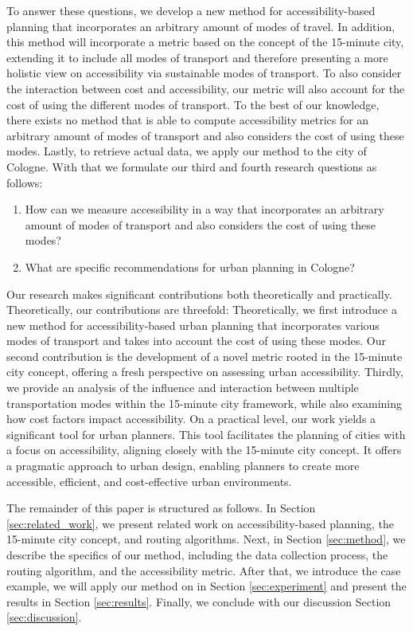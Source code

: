 To answer these questions, we develop a new method for accessibility-based planning that incorporates an arbitrary amount of modes of travel.
In addition, this method will incorporate a metric based on the concept of the 15-minute city, extending it to include all modes of transport and therefore presenting a more holistic view on accessibility via sustainable modes of transport.
To also consider the interaction between cost and accessibility, our metric will also account for the cost of using the different modes of transport.
To the best of our knowledge, there exists no method that is able to compute accessibility metrics for an arbitrary amount of modes of transport and also considers the cost of using these modes.
Lastly, to retrieve actual data, we apply our method to the city of Cologne.
With that we formulate our third and fourth research questions as follows:

\begin{enumerate}
  \renewcommand{\labelenumi}{RQ \theenumi.}
  \setcounter{enumi}{2}
  \item How can we measure accessibility in a way that incorporates an arbitrary amount of modes of transport and also considers the cost of using these modes?
  \label{rq:measure_accessibility}
  \item What are specific recommendations for urban planning in Cologne?
  \label{rq:recommendations}
\end{enumerate}

Our research makes significant contributions both theoretically and practically. Theoretically, our contributions are threefold:
Theoretically, we first introduce a new method for accessibility-based urban planning that incorporates various modes of transport and takes into account the cost of using these modes.
Our second contribution is the development of a novel metric rooted in the 15-minute city concept, offering a fresh perspective on assessing urban accessibility.
Thirdly, we provide an analysis of the influence and interaction between multiple transportation modes within the 15-minute city framework, while also examining how cost factors impact accessibility.
On a practical level, our work yields a significant tool for urban planners. 
This tool facilitates the planning of cities with a focus on accessibility, aligning closely with the 15-minute city concept. 
It offers a pragmatic approach to urban design, enabling planners to create more accessible, efficient, and cost-effective urban environments.

The remainder of this paper is structured as follows.
In Section \ref{sec:related_work}, we present related work on accessibility-based planning, the 15-minute city concept, and routing algorithms.
Next, in Section \ref{sec:method}, we describe the specifics of our method, including the data collection process, the routing algorithm, and the accessibility metric.
After that, we introduce the case example, we will apply our method on in Section \ref{sec:experiment} and present the results in Section \ref{sec:results}.
Finally, we conclude with our discussion Section \ref{sec:discussion}.

